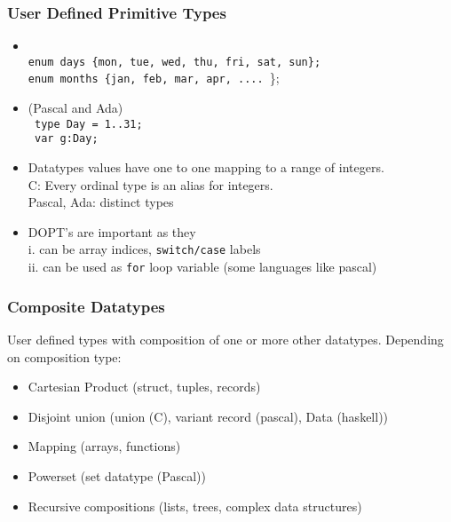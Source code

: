 \begin{frame}
\frametitle{User Defined Primitive Types}
\begin{itemize}
\item {}\\
	\texttt{enum days \{mon, tue, wed, thu, fri, sat, sun\};\\}
	\texttt{enum months \{jan, feb, mar, apr,  .... }\};\\
\item {} (Pascal and Ada)\\
	\texttt{ type Day = 1..31; }\\
	\texttt{ var g:Day; }
\item {} Datatypes values have one to one mapping to
a range of integers.\\
C: Every ordinal type is an alias for integers.\\
Pascal, Ada: distinct types
\item DOPT's are important as they\\
	i. can be array indices, \texttt{switch/case} labels\\
	ii. can be used as \texttt{for} loop variable (some languages like pascal)
\end{itemize}
\end{frame}

\begin{frame}
\frametitle{Composite Datatypes}
User defined types with composition of one or more other datatypes. Depending
on composition type:
\begin{itemize}[<+->]
\item Cartesian Product (struct, tuples, records)
\item Disjoint union (union (C), variant record (pascal), Data (haskell))
\item Mapping (arrays, functions)
\item Powerset (set datatype (Pascal))
\item Recursive compositions (lists, trees, complex data structures)
\end{itemize}
\end{frame}

